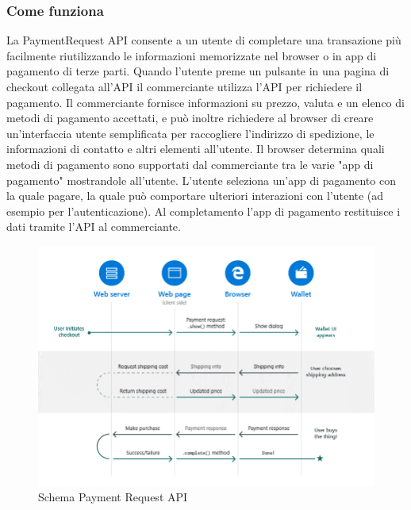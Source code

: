 \documentclass[11pt ,a4paper , twoside , openright ]{article}
\begin{document}
\subsubsection{Come funziona}	
La PaymentRequest API consente a un utente di completare una transazione più facilmente riutilizzando le informazioni memorizzate nel browser o in app di pagamento di terze parti.
Quando l'utente preme un pulsante in una pagina di checkout collegata all'API il commerciante utilizza l'API per richiedere il pagamento. Il commerciante fornisce informazioni su prezzo, valuta e un elenco di metodi di pagamento accettati, e può inoltre richiedere al browser di creare un'interfaccia utente semplificata per raccogliere l'indirizzo di spedizione, le informazioni di contatto e altri elementi all'utente.
Il browser determina quali metodi di pagamento sono supportati dal commerciante tra le varie "app di pagamento" mostrandole all'utente. 
L'utente seleziona un'app di pagamento con la quale pagare, la quale può comportare ulteriori interazioni con l'utente (ad esempio per l'autenticazione). 
Al completamento l'app di pagamento restituisce i dati tramite l'API al commerciante.

\begin{figure}[h]
	\centering
	\includegraphics[width=1\linewidth]{SchemaPayment}
	\caption{Schema Payment Request API}
	\label{fig:Schema Payment}
\end{figure}
\pagebreak
\end{document}
